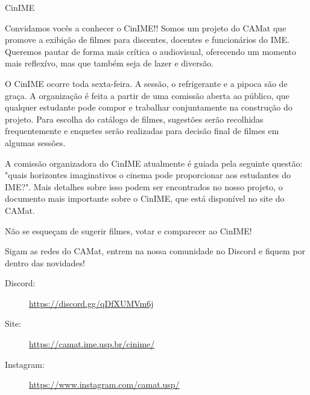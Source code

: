 \begin{subsecao}{CinIME}


Convidamos vocês a conhecer o CinIME!! Somos um projeto do CAMat que promove a
exibição de filmes para discentes, docentes e funcionários do IME. Queremos pautar
de forma mais crítica o audiovisual, oferecendo um momento mais reflexívo, mas que 
também seja de lazer e diversão.

O CinIME ocorre toda sexta-feira. A sessão, o refrigerante e a pipoca são de graça. 
A organização é feita a partir de uma comissão aberta ao público, que
qualquer estudante pode compor e trabalhar conjuntamente na construção do projeto. 
Para escolha do catálogo de filmes, sugestões serão recolhidas
frequentemente e enquetes serão realizadas para decisão final de filmes em algumas
sessões.

A comissão organizadora do CinIME atualmente é guiada pela seguinte questão: "quais 
horizontes imaginativos o cinema pode proporcionar aos estudantes do IME?". Mais detalhes
sobre isso podem ser encontrados no nosso projeto, o documento mais importante sobre o 
CinIME, que está disponível no site do CAMat.

Não se esqueçam de sugerir filmes, votar e comparecer ao CinIME!

Sigam as redes do CAMat, entrem na nossa comunidade no Discord e fiquem por dentro das novidades!

\begin{description}
   \item[Discord:] \url{https://discord.gg/qDfXUMVm6j}
  \item[Site:] \url{https://camat.ime.usp.br/cinime/}
  \item[Instagram:] \url{https://www.instagram.com/camat.usp/}
\end{description}

\end{subsecao}
